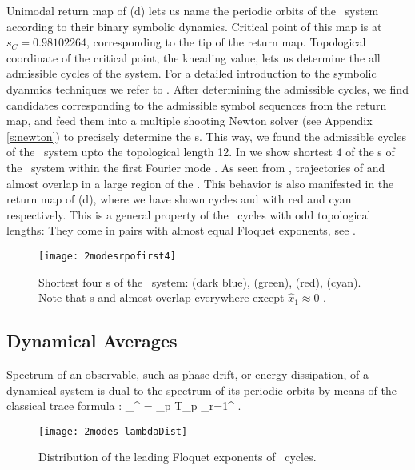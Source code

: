 Unimodal return map of  (d) lets us name the periodic orbits of the \twomode\ system according to their binary symbolic dynamics. Critical point of this map is at $s_C=0.98102264$, corresponding to the tip of the return map. Topological coordinate of the critical point, the kneading value, lets us determine the all admissible cycles of the system. For a detailed introduction to the symbolic dyanmics techniques we refer to . After determining the admissible cycles, we find candidates corresponding to the admissible symbol sequences from the return map, and feed them into a multiple shooting Newton solver (see Appendix \ref{s:newton}) to precisely determine the \rpo s. This way, we found the admissible cycles of the \twomode\ system upto the topological length 12. In  we show shortest $4$ of the \rpo s of the \twomode\ system within the first Fourier mode \slicePlane . As seen from , trajectories of  and  almost overlap in a large region of the \statesp . This behavior is also manifested in the return map of  (d), where we have shown cycles  and  with red and cyan respectively. This is a general property of the \twomode\ cycles with odd topological lengths: They come in pairs with almost equal Floquet exponents, see .

\begin{figure}%
\centering
 \texttt{[image: 2modesrpofirst4]}
\caption{Shortest four \rpo s of the \twomode\ system:  (dark blue),  (green),  (red),  (cyan). Note that \rpo s  and  almost overlap everywhere except $\hat{x}_1 \approx 0$ .}
\label{f-2modesrpofirst4}
\end{figure}

\subsection{Dynamical Averages}
Spectrum of an observable, such as phase drift, or energy dissipation, of a dynamical system is dual to the spectrum of its periodic orbits by means of the classical trace formula :
\beq
\sum_{}^{\infty}  = \sum_p T_p \sum_{r=1}^{\infty}  .

\begin{figure}%
\centering
 \texttt{[image: 2modes-lambdaDist]}
\caption{Distribution of the leading Floquet exponents of \twomode\ cycles.}
\label{f-2modes-lambdaDist}
\end{figure}


